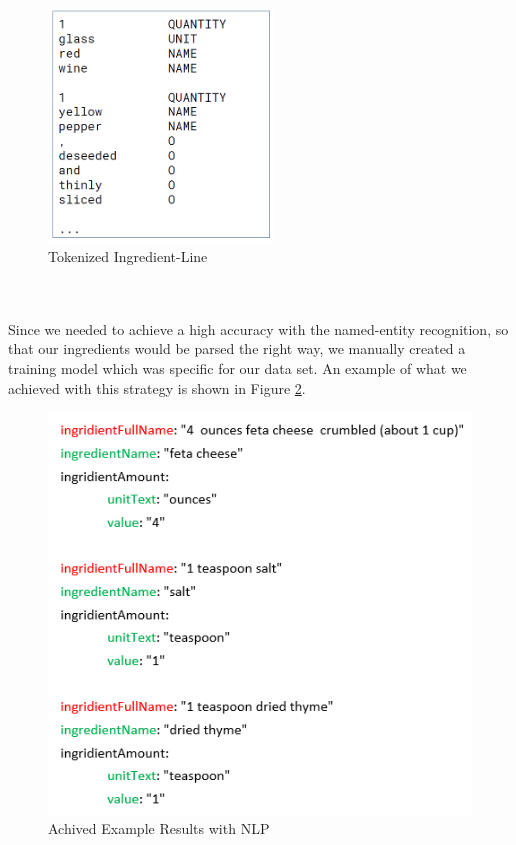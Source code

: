\documentclass{article}
\begin{document}
\begin{figure}[H]
  \centering
  \includegraphics[width=6cm]{pictures/tokens.png}
  \caption{Tokenized Ingredient-Line}
  \label{fig:tokens}
\end{figure}
\noindent
\\ \\
Since we needed to achieve a high accuracy with the named-entity recognition, so that our ingredients would be parsed the right way, we manually created a training model which was specific for our data set. An example of what we achieved with this strategy is shown in Figure \ref{fig:nlp}.

\begin{figure}[H]
  \centering
  \includegraphics[width=12cm]{pictures/nlp.png}
  \caption{Achived Example Results with NLP}
  \label{fig:nlp}
\end{figure}
\noindent
\end{document}
